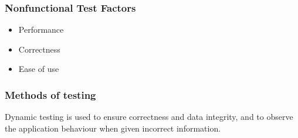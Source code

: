 \documentclass[12pt]{article}
\begin{document}
\subsubsection{Nonfunctional Test Factors}
\begin{itemize}
  \item Performance
  \item 	Correctness
  \item 	Ease of use
\end{itemize}

\subsubsection{Methods of testing}
Dynamic testing is used to ensure correctness and data integrity, and to observe the application behaviour when given incorrect information.
\end{document}
